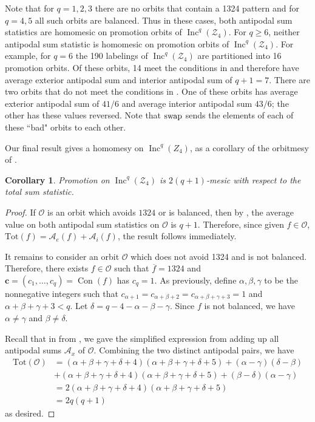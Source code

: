 \documentclass[11pt]{amsart}
\newtheorem{corollary}[theorem]{Corollary}
\theoremstyle{definition}
\newcommand{\tot}{\mathrm{Tot}}
\DeclareMathOperator{\Inc}{\mathrm{Inc}}
\DeclareMathOperator{\Con}{\mathrm{Con}}
\newcommand{\swap}{\textnormal{swap}}
\newcommand{\calZ}{\mathcal{Z}}
\begin{document}
Note that for $q=1,2,3$ there are no orbits that contain a 1324 pattern and for $q=4,5$ all such orbits are balanced. Thus in these cases, both antipodal sum statistics are homomesic on promotion orbits of $\Inc^q(\calZ_4)$.  For $q\geq6$, neither antipodal sum statistic is homomesic on promotion orbits of $\Inc^q(\calZ_4)$.  For example, for $q=6$ the 190 labelings of $\Inc^q(\calZ_4)$ are partitioned into 16 promotion orbits.  Of these orbits, 14 meet the conditions in  and therefore have average exterior antipodal sum and interior antipodal sum of $q+1=7$.  There are two orbits that do not meet the conditions in .  One of these orbits  has average exterior antipodal sum of $41/6$ and average interior antipodal sum $43/6$; the other has these values reversed.  Note that $\swap$ sends the elements of each of these ``bad" orbits to each other.

Our final result gives a homomesy on $\Inc^q(Z_4)$, as a corollary of the orbitmesy of . 
\begin{corollary}
\label{Z4_totalsum}
    Promotion on $\Inc^q(\calZ_4)$ is $2(q+1)$-mesic with respect to the total sum statistic.
\end{corollary}

\begin{proof}
If $\mathcal{O}$ is an orbit which avoids $1324$ or is balanced, then by , the average value on both antipodal sum statistics on $\mathcal{O}$ is $q+1$. Therefore, since given $f \in \mathcal{O}$, $\tot(f) = \mathcal{A}_e(f) + \mathcal{A}_i(f)$, the result follows immediately.

It remains to consider an orbit $\mathcal{O}$ which does not avoid 1324 and is not balanced. Therefore, there exists $f \in \mathcal{O}$ such that $\overline{f} = 1324$ and $\mathbf{c} = (c_1,\ldots,c_q) = \Con(f)$ has $c_q = 1$. As previously, define  $\alpha,\beta,\gamma$ to be the nonnegative integers such that $c_{\alpha+1} = c_{\alpha+\beta+2} = c_{\alpha+\beta+\gamma+3}= 1$ and $\alpha+\beta+\gamma+3 < q$. Let $\delta = q - 4 - \alpha - \beta - \gamma$. Since $f$ is not balanced,  we have $\alpha \neq \gamma$ and $\beta \neq \delta$.

Recall that in  from , we gave the simplified expression from adding up all antipodal sums $\mathcal{A}_x$ of $\mathcal{O}$.  Combining the two distinct antipodal pairs, we have 
\begin{align*}
\tot(\mathcal{O}) &= (\alpha + \beta + \gamma + \delta + 4)(\alpha + \beta + \gamma + \delta + 5) + (\alpha-\gamma)(\delta-\beta)\\ 
&+ (\alpha + \beta + \gamma + \delta + 4)(\alpha + \beta + \gamma + \delta + 5) + (\beta-\delta)(\alpha-\gamma)\\
&= 2(\alpha + \beta + \gamma + \delta + 4)(\alpha + \beta + \gamma + \delta + 5)\\
&=2q(q+1)
\end{align*}
as desired.
\end{proof}
\end{document}

